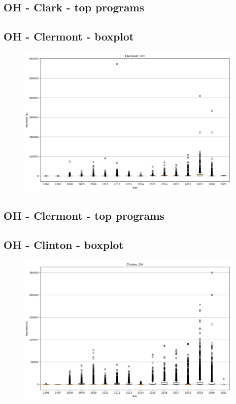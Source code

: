 \subsection*{OH - Clark - top programs}

\newpage
\subsection*{OH - Clermont - boxplot}
\begin{figure}[h]
\centering
\includegraphics[width=7in]{../output/boxplots/counties/Clermont-OH_boxplot.png}
\end{figure}


\subsection*{OH - Clermont - top programs}

\newpage
\subsection*{OH - Clinton - boxplot}
\begin{figure}[h]
\centering
\includegraphics[width=7in]{../output/boxplots/counties/Clinton-OH_boxplot.png}
\end{figure}


